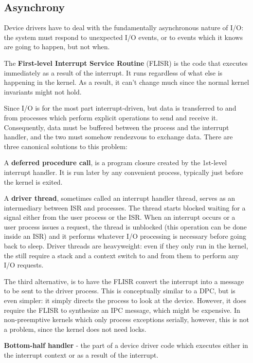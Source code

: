 \subsection{Asynchrony}

Device drivers have to deal with the fundamentally asynchronous nature of I/O: the system must respond to unexpected I/O events, or to events which it knows are going to happen, but not when. \medskip

The \textbf{First-level Interrupt Service Routine} (FLISR) is the code that executes immediately as a result of the interrupt. It runs regardless of what else is happening in the kernel. As a result, it can't change much since the normal kernel invariants might not hold. \medskip

Since I/O is for the most part interrupt-driven, but data is transferred to and from processes which perform explicit operations to send and receive it. Consequently, data must be buffered between the process and the interrupt handler, and the two must somehow rendezvous to exchange data. There are three canonical solutions to this problem: \medskip

A \textbf{deferred procedure call}, is a program closure created by the 1st-level interrupt handler. It is run later by any convenient process, typically just before the kernel is exited. \medskip

A \textbf{driver thread}, sometimes called an interrupt handler thread, serves as an intermediary between ISR and processes. The thread starts blocked waiting for a signal either from the user process or the ISR. When an interrupt occurs or a user process issues a request, the thread is unblocked (this operation can be done inside an ISR) and it performs whatever I/O processing is necessary before going back to sleep. Driver threads are heavyweight: even if they only run in the kernel, the still require a stack and a context switch to and from them to perform any I/O requests. \medskip

The third alternative, is to have the FLISR convert the interrupt into a message to be sent to the driver process. This is conceptually similar to a DPC, but is even simpler: it simply directs the process to look at the device. However, it does require the FLISR to synthesize an IPC message, which might be expensive. In non-preemptive kernels which only process exceptions serially, however, this is not a problem, since the kernel does not need locks. \medskip

\textbf{Bottom-half handler} - the part of a device driver code which executes either in the interrupt context or as a result of the interrupt. \medskip

